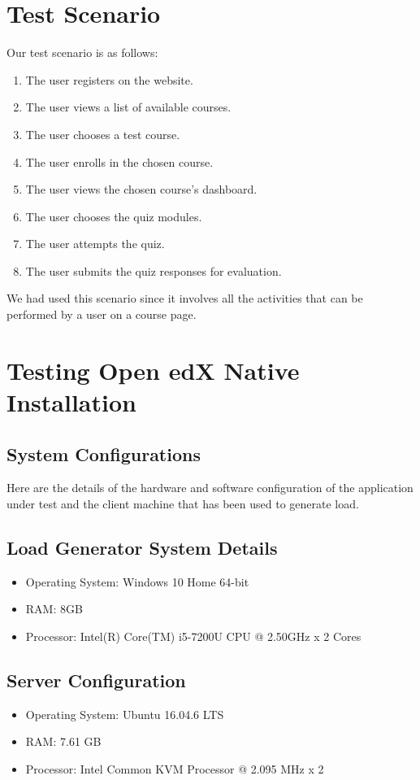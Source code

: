 \documentclass[12pt]{article}
\begin{document}
\section*{Test Scenario}
Our test scenario is as follows:
\begin{enumerate}
	\item The user registers on the website.
	\item The user views a list of available courses.
	\item The user chooses a test course.
	\item The user enrolls in the chosen course.
	\item The user views the chosen course's dashboard.
	\item The user chooses the quiz modules.
	\item The user attempts the quiz.
	\item The user submits the quiz responses for evaluation.
\end{enumerate}
We had used this scenario since it involves all the activities that can be performed by a user on a course page.
\par
\section*{Testing Open edX Native Installation}
\subsection{System Configurations}
Here are the details of the hardware and software configuration of the application under test and the client machine that has been used to generate load.
\subsection*{Load Generator System Details}
\begin{itemize}
	\item Operating System: Windows 10 Home 64-bit
	\item RAM: 8GB
	\item Processor: Intel(R) Core(TM) i5-7200U CPU @ 2.50GHz x 2 Cores
\end{itemize}
\subsection*{Server Configuration}
\begin{itemize}
	\item Operating System: Ubuntu 16.04.6 LTS
	\item RAM: 7.61 GB
	\item Processor: Intel Common KVM Processor @ 2.095 MHz x 2
\end{itemize}
\end{document}
